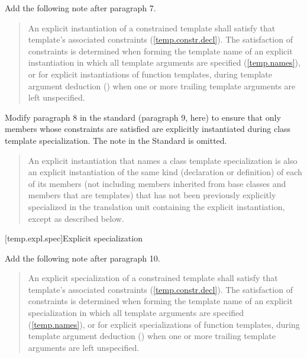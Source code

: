 Add the following note after paragraph 7.

\begin{quote}
\setcounter{Paras}{7}
\begin{addedblock}
\pnum
\enternote
An explicit instantiation of a constrained template shall satisfy that
template's associated constraints (\ref{temp.constr.decl}). The satisfaction
of constraints is determined when forming the template name of an
explicit instantiation
in which all template arguments are specified (\ref{temp.names}), or for
explicit instantiations of function templates, during template argument 
deduction () when one or more trailing template 
arguments are left unspecified.
\exitnote
\end{addedblock}
\end{quote}

Modify paragraph 8 in the \Cpp standard (paragraph 9, here) to ensure that 
only members whose constraints are satisfied are explicitly instantiated 
during class template specialization. The note in the \Cpp Standard is omitted.

\begin{quote}
\setcounter{Paras}{8}
\pnum
An explicit instantiation that names a class template specialization is 
also an explicit instantiation of the same kind (declaration or 
definition) of each of its members (not including members inherited from 
base classes and members that are templates) that has not been previously 
explicitly specialized in the translation unit containing the explicit 
instantiation, 
except as described below.
\end{quote}

[temp.expl.spec]{Explicit specialization}

Add the following note after paragraph 10.

\begin{quote}
\setcounter{Paras}{10}
\begin{addedblock}
\pnum
\enternote
An explicit specialization of a constrained template shall satisfy that
template's associated constraints (\ref{temp.constr.decl}). The satisfaction
of constraints is determined 
when forming the template name of an explicit specialization in which all 
template arguments are specified (\ref{temp.names}), or for
explicit specializations of function templates, during template argument 
deduction () when one or more trailing template 
arguments are left unspecified.
\exitnote
\end{addedblock}
\end{quote}


